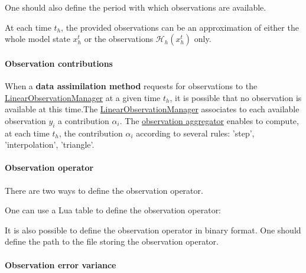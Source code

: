 \documentclass{tufte-book}
\begin{document}
\-One should also define the period with which observations are available.

\-At each time $t_h$, the provided observations can be an approximation of either the whole model state $x^t_{h}$ or the observations $\mathcal{H}_h(x^t_h)$ only.\hypertarget{linear_observation_manager_sub12}{}\paragraph{\-Observation contributions}\label{linear_observation_manager_sub12}
\-When a {\bfseries data assimilation method} requests for observations to the {\ttfamily  \hyperlink{class_verdandi_1_1_linear_observation_manager}{\-Linear\-Observation\-Manager}} at a given time $t_h$, it is possible that no observation is available at this time.\-The {\ttfamily  \hyperlink{class_verdandi_1_1_linear_observation_manager}{\-Linear\-Observation\-Manager}} associates to each available observation $y_i$ a contribution $ \alpha_i$. \-The \hyperlink{observation_aggregator}{observation aggregator} enables to compute, at each time $t_h$, the contribution $\alpha_i$ according to several rules\-: 'step', 'interpolation', 'triangle'.\hypertarget{linear_observation_manager_observation2}{}\paragraph{\-Observation operator}\label{linear_observation_manager_observation2}
\-There are two ways to define the observation operator.

\-One can use a \-Lua table to define the observation operator\-:

 \begin{frame_lua}
observation = {

    ...
   operator = {

        ...
      value = {1, 0, 0, 0
               0, 0, 1, 0}

   },
    ...

\end{frame_lua}


\-It is also possible to define the observation operator in binary format. \-One should define the path to the file storing the observation operator.\hypertarget{linear_observation_manager_observation3}{}\paragraph{\-Observation error variance}\label{linear_observation_manager_observation3}
\end{document}

